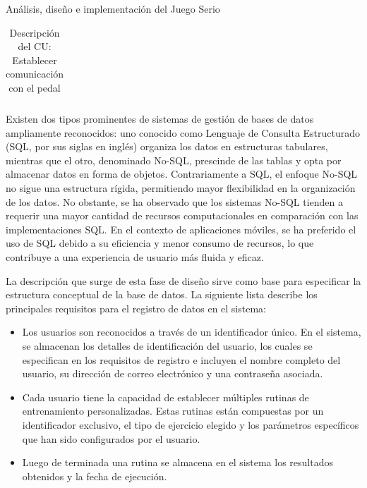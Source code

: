 \begin{thesischapter}{2} {Análisis, diseño e implementación del Juego Serio}
\begin{center}
\begin{table}
\begin{tabularx}{\textwidth}{|X|X|}
            \end{tabularx}

            \caption{Descripción del CU: Establecer comunicación con el pedal}
        \end{table}
    \end{center}
    
    \newpage
    Existen dos tipos prominentes de sistemas de gestión de bases de datos ampliamente reconocidos: uno conocido 
    como Lenguaje de Consulta Estructurado (SQL, por sus siglas en inglés) organiza los datos en estructuras tabulares, 
    mientras que el otro, denominado No-SQL, prescinde de las tablas y opta por almacenar datos en forma de objetos. 
    Contrariamente a SQL, el enfoque No-SQL no sigue una estructura rígida, permitiendo mayor flexibilidad en la 
    organización de los datos. No obstante, se ha observado que los sistemas No-SQL tienden a requerir una mayor 
    cantidad de recursos computacionales en comparación con las implementaciones SQL. En el contexto de aplicaciones 
    móviles, se ha preferido el uso de SQL debido a su eficiencia y menor consumo de recursos, lo que contribuye a una 
    experiencia de usuario más fluida y eficaz.

    \vspace{10pt}
    La descripción que surge de esta fase de diseño sirve como base para especificar la estructura conceptual de la base de datos. 
    La siguiente lista describe los principales requisitos para el registro de datos en el sistema:
    \begin{itemize}
        \item Los usuarios son reconocidos a través de un identificador único. En el sistema, se almacenan los detalles de identificación del usuario, los cuales se especifican en los requisitos de registro e incluyen el nombre completo del usuario, su dirección de correo electrónico y una contraseña asociada.
        \item Cada usuario tiene la capacidad de establecer múltiples rutinas de entrenamiento personalizadas. Estas rutinas están compuestas por un identificador exclusivo, el tipo de ejercicio elegido y los parámetros específicos que han sido configurados por el usuario. 
        \item Luego de terminada una rutina se almacena en el sistema los resultados obtenidos y la fecha de ejecución. 
    \end{itemize}   
    

\end{thesischapter}
